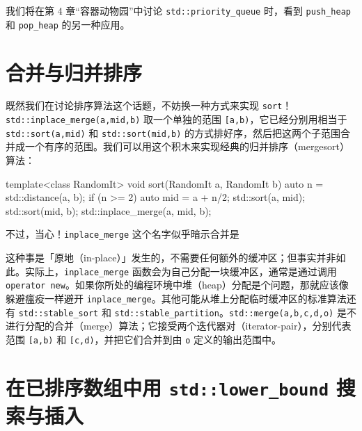 我们将在第 4 章“容器动物园”中讨论 \texttt{std::\allowbreak{}priority\_\allowbreak{}queue} 时，看到 \texttt{push\_\allowbreak{}heap} 和 \texttt{pop\_\allowbreak{}heap} 的另一种应用。

\section{合并与归并排序}

既然我们在讨论排序算法这个话题，不妨换一种方式来实现 \texttt{sort}！\texttt{std::\allowbreak{}inplace\_\allowbreak{}merge(\allowbreak{}a,\allowbreak{}mid,\allowbreak{}b)\allowbreak{}} 取一个单独的范围 \texttt{[a,\allowbreak{}b)\allowbreak{}}，它已经分别用相当于 \texttt{std::\allowbreak{}sort(\allowbreak{}a,\allowbreak{}mid)\allowbreak{}} 和 \texttt{std::\allowbreak{}sort(\allowbreak{}mid,\allowbreak{}b)\allowbreak{}} 的方式排好序，然后把这两个子范围合并成一个有序的范围。我们可以用这个积木来实现经典的归并排序（mergesort）算法：

\begin{codebox}[cpp]
     template<class RandomIt>
     void sort(RandomIt a, RandomIt b)
     {
       auto n = std::distance(a, b);
       if (n >= 2) {
         auto mid = a + n/2;
         std::sort(a, mid);
         std::sort(mid, b);
         std::inplace_merge(a, mid, b);
       }
     }
\end{codebox}

不过，当心！\texttt{inplace\_\allowbreak{}merge} 这个名字似乎暗示合并是

这种事是「原地（in-place）」发生的，不需要任何额外的缓冲区；但事实并非如此。实际上，\texttt{inplace\_\allowbreak{}merge} 函数会为自己分配一块缓冲区，通常是通过调用 \texttt{operator new}。如果你所处的编程环境中堆（heap）分配是个问题，那就应该像躲避瘟疫一样避开 \texttt{inplace\_\allowbreak{}merge}。其他可能从堆上分配临时缓冲区的标准算法还有 \texttt{std::\allowbreak{}stable\_\allowbreak{}sort} 和 \texttt{std::\allowbreak{}stable\_\allowbreak{}partition}。\texttt{std::\allowbreak{}merge(\allowbreak{}a,\allowbreak{}b,\allowbreak{}c,\allowbreak{}d,\allowbreak{}o)\allowbreak{}} 是不进行分配的合并（merge）算法；它接受两个迭代器对（iterator-pair），分别代表范围 \texttt{[a,\allowbreak{}b)\allowbreak{}} 和 \texttt{[c,\allowbreak{}d)\allowbreak{}}，并把它们合并到由 \texttt{o} 定义的输出范围中。

\section{在已排序数组中用 \texttt{std::\allowbreak{}lower\_\allowbreak{}bound} 搜索与插入}

